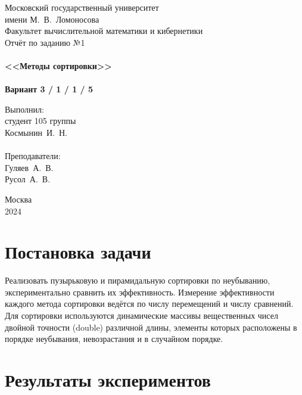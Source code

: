 \documentclass[a4paper,12pt,titlepage,finall]{article}
\begin{document}
\begin{titlepage}
    \begin{center}
    {\small \sc Московский государственный университет \\имени М.~В.~Ломоносова\\ Факультет вычислительной математики и кибернетики\\}
    \vfill
    {\large \sc Отчёт по заданию №1}\\~\\
    {\large \bf <<Методы сортировки>>}\\~\\
    {\large \bf Вариант 3 / 1 / 1 / 5}
    \end{center}

    \begin{flushright}
    \vfill
    {Выполнил:\\студент 105 группы\\Космынин~И.~Н.\\~\\
    Преподаватели:\\Гуляев~А.~В.\\Русол~А.~В.}
    \end{flushright}

    \begin{center}
    \vfill
    {\small Москва\\2024}
    \end{center}
\end{titlepage}

\tableofcontents
\newpage

\section{Постановка задачи}

Реализовать пузырьковую и пирамидальную сортировки по неубыванию, экспериментально сравнить их эффективность. Измерение эффективности каждого метода сортировки ведётся по числу перемещений и числу сравнений. Для сортировки используются динамические массивы вещественных чисел двойной точности (double) различной длины, элементы которых расположены в порядке неубывания, невозрастания и в случайном порядке.

\newpage

\section{Результаты экспериментов}
\end{document}
